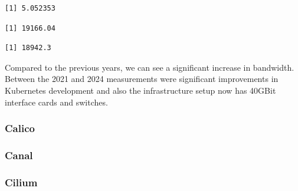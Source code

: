 \begin{verbatim}
[1] 5.052353
\end{verbatim}

\begin{Shaded}
\begin{Highlighting}[]
\SpecialCharTok{\$}
\end{Highlighting}
\end{Shaded}

\begin{verbatim}
[1] 19166.04
\end{verbatim}

\begin{Shaded}
\begin{Highlighting}[]
\SpecialCharTok{\$}
\end{Highlighting}
\end{Shaded}

\begin{verbatim}
[1] 18942.3
\end{verbatim}

Compared to the previous years, we can see a significant increase in bandwidth. Between the 2021 and 2024 measurements were significant improvements in Kubernetes development and also the infrastructure setup now has 40GBit interface cards and switches.

\subsubsection{Calico}

\subsubsection{Canal}

\subsubsection{Cilium}
